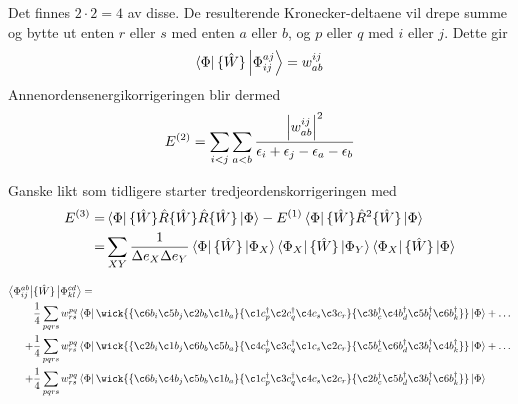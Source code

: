 \documentclass{beamer}
\begin{document}
\begin{frame}
	Det finnes $2\cdot2=4$ av disse. De resulterende Kronecker-deltaene vil drepe summe og bytte ut enten $r$ eller $s$ med enten $a$ eller $b$, og $p$ eller $q$ med $i$ eller $j$. Dette gir
	\begin{equation}
		\bra{\Phi} \{\hat W\}\ket{\Phi_{ij}^{aj}} = w_{ab}^{ij}
	\end{equation}
	Annenordensenergikorrigeringen blir dermed
	\begin{equation}
		E^{(2)} = \sum_{i<j}\sum_{a<b} \frac{\abs{w_{ab}^{ij}}^2}{\epsilon_i + \epsilon_j - \epsilon_a - \epsilon_b}
	\end{equation}
\end{frame}

\begin{frame}
	Ganske likt som tidligere starter tredjeordenskorrigeringen med
	\begin{align}
		E^{(3)} =& \bra{\Phi} \{\hat W\} \hat R \{\hat W\} \hat R \{\hat W\} \ket{\Phi} - E^{(1)} \bra{\Phi}\{\hat W\} \hat R^2 \{\hat W\} \ket{\Phi} \\
				=& \sum_{XY} \frac{1}{\Delta e_X \Delta e_Y} \bra{\Phi} \{\hat W\} \ket{\Phi_X} \bra{\Phi_X} \{\hat W\} \ket{\Phi_Y} \bra{\Phi_X} \{\hat W\} \ket{\Phi}
	\end{align}
\end{frame}

\begin{frame}
	\begin{align*}
		\bra{\Phi_{ij}^{ab}}& \{\hat W \} \ket{\Phi_{kl}^{cd}} = \\
			 &\frac{1}{4}\sum_{pqrs} w_{rs}^{pq} \bra{\Phi}
			 \wick{			 
			 \{\c6 b_i \c5 b_j \c2 b_b \c1 b_a \} \{ \c1 c^\dagger_p \c2 c^\dagger_q \c4 c_s \c3 c_r \} \{\c3 b^\dagger_c \c4 b^\dagger_d \c5 b^\dagger_l \c6 b^\dagger_k \} 
			}	 		 
			\ket{\Phi} + \dots \\
		+&\frac{1}{4}\sum_{pqrs} w_{rs}^{pq} \bra{\Phi}
		\wick{			 
			 \{\c2 b_i \c1 b_j  \c6 b_b  \c5 b_a \} \{\c4 c^\dagger_p \c3 c^\dagger_q \c1 c_s \c2 c_r \} \{  \c5 b^\dagger_c \c6  b^\dagger_d \c3 b^\dagger_l \c4 b^\dagger_k \} 
			}
			\ket{\Phi} + \dots \\
		+&\frac{1}{4}\sum_{pqrs} w_{rs}^{pq} \bra{\Phi}
		\wick{			 
			 \{\c6 b_i \c4 b_j   \c5 b_b  \c1 b_a \} \{ \c1 c^\dagger_p  \c3 c^\dagger_q \c4 c_s \c2 c_r \} \{ \c2 b^\dagger_c  \c5 b^\dagger_d \c3 b^\dagger_l \c6 b^\dagger_k \} 
			}
			\ket{\Phi}
	\end{align*}
\end{frame}
\end{document}
